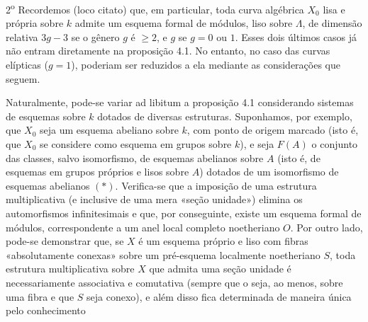 \documentclass[11pt,twoside,openany]{book}
\numberwithin{equation}{section}
\theoremstyle{plain}
\theoremstyle{definition}
\theoremstyle{remark}
\begin{document}
2\textsuperscript{o} Recordemos (loco citato) que, em particular, toda curva
algébrica $X_0$ lisa e própria sobre $k$ admite um esquema formal de módulos,
liso sobre $\Lambda$, de dimensão relativa $3g-3$ se o gênero $g$ é
$\geq2$, e $g$ se $g=0$ ou $1$. Esses dois últimos casos já não entram diretamente
na proposição 4.1. No entanto, no caso das curvas elípticas
($g=1$), poderiam ser reduzidos a ela mediante as considerações que seguem.

Naturalmente, pode-se variar ad libitum a proposição 4.1 considerando
sistemas de esquemas sobre $k$ dotados de diversas estruturas. Suponhamos,
por exemplo, que $X_0$ seja um esquema abeliano sobre $k$, com ponto de origem
marcado (isto é, que $X_0$ se considere como esquema em grupos sobre $k$), e
seja $F(A)$ o conjunto das classes, salvo isomorfismo, de esquemas abelianos
sobre $A$ (isto é, de esquemas em grupos próprios e lisos sobre $A$) dotados
de um isomorfismo de esquemas abelianos $(*)$. Verifica-se que a imposição
de uma estrutura multiplicativa (e inclusive de uma mera «seção unidade»)
elimina os automorfismos infinitesimais e que, por conseguinte, existe um
esquema formal de módulos, correspondente a um anel local completo
noetheriano $O$. Por outro lado, pode-se demonstrar que, se $X$ é um esquema
próprio e liso com fibras «absolutamente conexas» sobre um pré-esquema localmente
noetheriano $S$, toda estrutura multiplicativa sobre $X$ que admita uma
seção unidade é necessariamente associativa e comutativa (sempre que o seja,
ao menos, sobre uma fibra e que $S$ seja conexo), e além disso fica determinada de
maneira única pelo conhecimento
\end{document}
